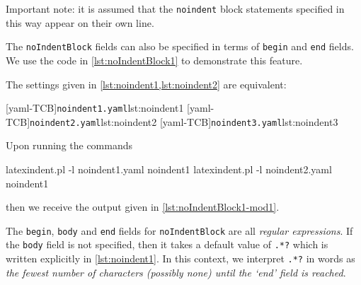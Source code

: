 \documentclass[10pt]{article}
\begin{document}

 Important note: it is assumed that the \texttt{noindent} block statements specified in
 this way appear on their own line.

 \begin{example}
 The \texttt{noIndentBlock} fields can also be specified in terms of \texttt{begin} and
 \texttt{end} fields. We use the code in \cref{lst:noIndentBlock1} to demonstrate this
 feature.%


 The settings given in \cref{lst:noindent1,lst:noindent2} are equivalent:

 \begin{cmhtcbraster}[raster columns=3,
   raster left skip=-3.5cm,
   raster right skip=-2cm,
   raster column skip=.03\linewidth]
  [yaml-TCB]{\texttt{noindent1.yaml}}{lst:noindent1}
  [yaml-TCB]{\texttt{noindent2.yaml}}{lst:noindent2}
  [yaml-TCB]{\texttt{noindent3.yaml}}{lst:noindent3}
 \end{cmhtcbraster}

 Upon running the commands

 \begin{commandshell}
latexindent.pl -l noindent1.yaml noindent1
latexindent.pl -l noindent2.yaml noindent1
\end{commandshell}

 then we receive the output given in \cref{lst:noIndentBlock1-mod1}.


 \end{example}

 The \texttt{begin}, \texttt{body} and \texttt{end} fields for \texttt{noIndentBlock} are
 all \emph{regular expressions}. If the \texttt{body} field is not specified, then it
 takes a default value of \lstinline!.*?! which is written explicitly in
 \cref{lst:noindent1}. In this context, we interpret \lstinline!.*?! in words as
 \emph{the fewest number of characters (possibly none) until the `end' field is reached}.
\end{document}

